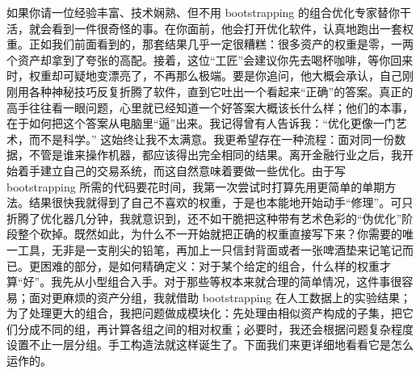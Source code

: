 \begin{chineseblock}如果你请一位经验丰富、技术娴熟、但不用 bootstrapping 的组合优化专家替你干活，就会看到一件很奇怪的事。在你面前，他会打开优化软件，认真地跑出一套权重。正如我们前面看到的，那套结果几乎一定很糟糕：很多资产的权重是零，一两个资产却拿到了夸张的高配。接着，这位“工匠”会建议你先去喝杯咖啡，等你回来时，权重却可疑地变漂亮了，不再那么极端。要是你追问，他大概会承认，自己刚刚用各种神秘技巧反复折腾了软件，直到它吐出一个看起来“正确”的答案。真正的高手往往看一眼问题，心里就已经知道一个好答案大概该长什么样；他们的本事，在于如何把这个答案从电脑里“逼”出来。我记得曾有人告诉我：“优化更像一门艺术，而不是科学。” 这始终让我不太满意。我更希望存在一种流程：面对同一份数据，不管是谁来操作机器，都应该得出完全相同的结果。离开金融行业之后，我开始着手建立自己的交易系统，而这自然意味着要做一些优化。由于写 bootstrapping 所需的代码要花时间，我第一次尝试时打算先用更简单的单期方法。结果很快我就得到了自己不喜欢的权重，于是也本能地开始动手“修理”。可只折腾了优化器几分钟，我就意识到，还不如干脆把这种带有艺术色彩的“伪优化”阶段整个砍掉。既然如此，为什么不一开始就把正确的权重直接写下来？你需要的唯一工具，无非是一支削尖的铅笔，再加上一只信封背面或者一张啤酒垫来记笔记而已。更困难的部分，是如何精确定义：对于某个给定的组合，什么样的权重才算“好”。我先从小型组合入手。对于那些等权本来就合理的简单情况，这件事很容易；面对更麻烦的资产分组，我就借助 bootstrapping 在人工数据上的实验结果；为了处理更大的组合，我把问题做成模块化：先处理由相似资产构成的子集，把它们分成不同的组，再计算各组之间的相对权重；必要时，我还会根据问题复杂程度设置不止一层分组。手工构造法就这样诞生了。下面我们来更详细地看看它是怎么运作的。\end{chineseblock}


